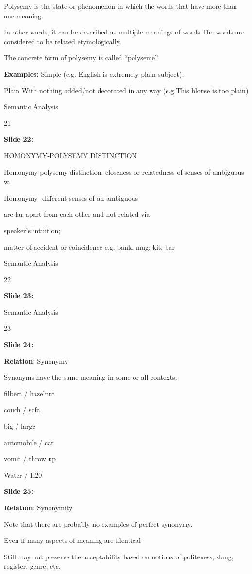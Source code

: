 \documentclass[11pt,a4paper]{article}
\begin{document}
Polysemy is the state or phenomenon in which the words  that have more than one meaning.

In other words, it can  be described as multiple meanings of words.The words  are considered to be related etymologically.

The concrete form of polysemy is called “polyseme”.

\textbf{Examples:}  Simple (e.g. English is extremely plain  subject).

Plain With nothing added/not decorated in any way  (e.g.This blouse is too plain)

Semantic Analysis

21

\textbf{Slide 22:}

HOMONYMY-POLYSEMY DISTINCTION

Homonymy-polysemy distinction: closeness or  relatedness of senses of ambiguous w.

Homonymy- different senses of an ambiguous

are far apart from each other and not related via

speaker’s intuition;

matter of accident or coincidence e.g. bank, mug; kit, bar

Semantic Analysis

22

\textbf{Slide 23:}

Semantic Analysis

23

\textbf{Slide 24:}

\textbf{Relation:}  Synonymy

Synonyms have the same meaning in some or all  contexts.

filbert / hazelnut

couch / sofa

big / large

automobile / car

vomit / throw up

Water / H20

\textbf{Slide 25:}

\textbf{Relation:}  Synonymity

Note that there are probably no examples of  perfect synonymy.

Even if many aspects of meaning are identical

Still may not preserve the acceptability based on  notions of politeness, slang, register, genre, etc.
\end{document}

